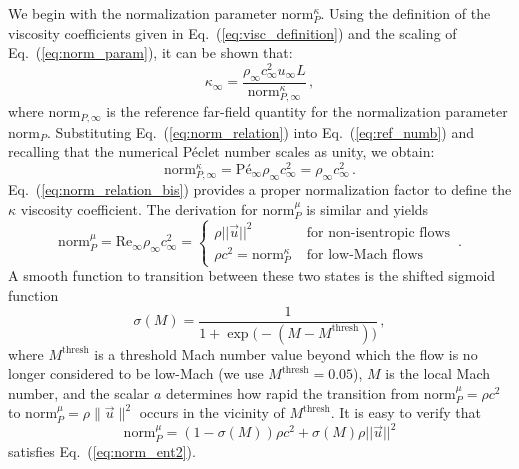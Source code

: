 \documentclass[preprint,10pt]{elsarticle}
\newcommand{\norm}{\textrm{norm}}
\renewcommand{\Re}{\textrm{Re}}
\newcommand{\Pe}{\textrm{P\'e}}
\newcommand{\resinew}{\widetilde{R}_\text{ent}}
\newcommand{\eqt}[1]{Eq.~(\ref{#1})}                     %
\begin{document}
We begin with the  normalization parameter $\norm_P^\kappa$. Using the 
definition of the viscosity coefficients given in \eqt{eq:visc_definition} and the scaling of 
\eqt{eq:norm_param}, it can be shown that:
%
\begin{equation}
\label{eq:norm_relation}
\kappa_\infty = \frac{ \rho_\infty c_\infty^2 u_\infty L }{ \norm_{P,\infty}^{\kappa} } \, ,
\end{equation}
%
where $\norm_{P,\infty}$ is the reference far-field quantity for the normalization parameter $\norm_P$. 
Substituting \eqt{eq:norm_relation} into \eqt{eq:ref_numb} and recalling that the numerical P\'eclet 
number scales as unity, we obtain:
%
\begin{equation}
\label{eq:norm_relation_bis}
\norm_{P,\infty}^{\kappa} = \Pe_\infty \rho_\infty c_\infty^2 = \rho_\infty c_\infty^2 \, .
\end{equation}
%
\eqt{eq:norm_relation_bis} provides a proper normalization factor to define the $\kappa$ viscosity coefficient.
%
The derivation for $\norm_P^\mu$ is similar and yields
\begin{equation}
\label{eq:norm_ent2}
\norm_P^\mu = \Re_\infty \rho_\infty c_\infty^2 =  \left\{
\begin{array}{ll}
 \rho ||\vec{u} ||^2       & \text{ for non-isentropic flows} \\
 \rho c^2 = \norm_P^\kappa & \text{ for low-Mach flows}
\end{array}
\right. \,.
\end{equation}
A smooth function to transition between these two states is the shifted sigmoid function
\begin{equation}
 \sigma(M) = \frac{1}{1+\exp\big(-(M-M^\text{thresh})\big)} \,,
\end{equation}
where $M^\text{thresh}$ is a threshold Mach number value beyond which the flow is no longer 
considered  to be low-Mach (we use $M^\text{thresh}=0.05$), $M$ is the local Mach number, 
and the scalar $a$ determines how rapid the transition from  
$\norm_P^\mu= \rho c^2$ to $\norm_P^\mu=\rho \| \vec{u}\|^2$ occurs in the vicinity of $M^\text{thresh}$. 
It is easy to verify that
\begin{equation}
\label{eq:norm_ent3}
\norm_P^\mu = (1-\sigma(M)) \rho c^2  + \sigma(M)  \rho ||\vec{u} ||^2  
\end{equation}
satisfies \eqt{eq:norm_ent2}.
%
\end{document}

